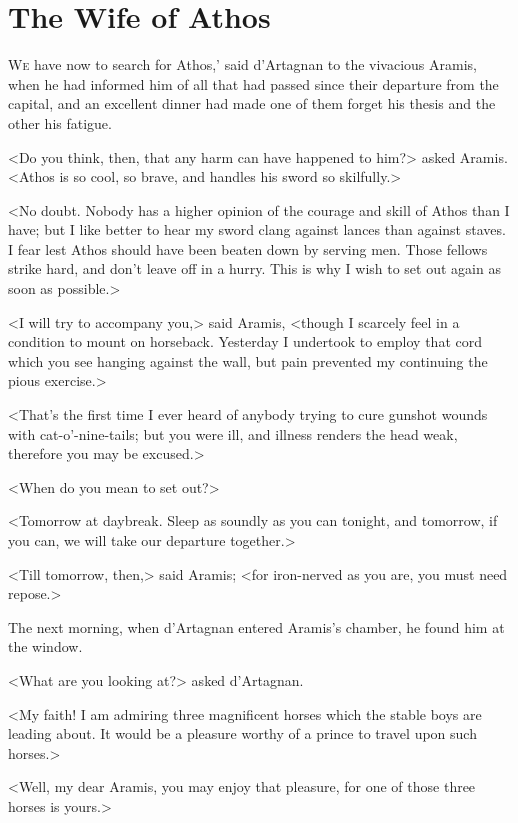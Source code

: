 
\chapter{The Wife of Athos}

\lettrine[,ante=`]{W}{e} have now to search for Athos,' said d'Artagnan to the vivacious Aramis, when he had informed him of all that had passed since their departure from the capital, and an excellent dinner had made one of them forget his thesis and the other his fatigue. 

<Do you think, then, that any harm can have happened to him?> asked Aramis. <Athos is so cool, so brave, and handles his sword so skilfully.> 

<No doubt. Nobody has a higher opinion of the courage and skill of Athos than I have; but I like better to hear my sword clang against lances than against staves. I fear lest Athos should have been beaten down by serving men. Those fellows strike hard, and don't leave off in a hurry. This is why I wish to set out again as soon as possible.> 

<I will try to accompany you,> said Aramis, <though I scarcely feel in a condition to mount on horseback. Yesterday I undertook to employ that cord which you see hanging against the wall, but pain prevented my continuing the pious exercise.> 

<That's the first time I ever heard of anybody trying to cure gunshot wounds with cat-o'-nine-tails; but you were ill, and illness renders the head weak, therefore you may be excused.> 

<When do you mean to set out?> 

<Tomorrow at daybreak. Sleep as soundly as you can tonight, and tomorrow, if you can, we will take our departure together.> 

<Till tomorrow, then,> said Aramis; <for iron-nerved as you are, you must need repose.> 

The next morning, when d'Artagnan entered Aramis's chamber, he found him at the window. 

<What are you looking at?> asked d'Artagnan. 

<My faith! I am admiring three magnificent horses which the stable boys are leading about. It would be a pleasure worthy of a prince to travel upon such horses.> 

<Well, my dear Aramis, you may enjoy that pleasure, for one of those three horses is yours.> 

